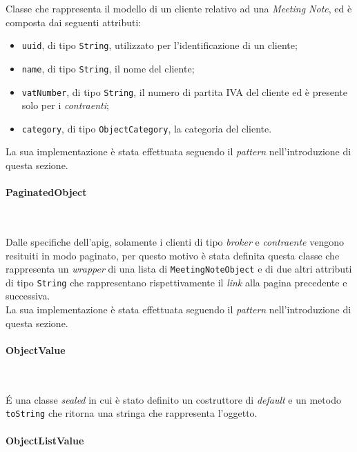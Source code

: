 \noindent Classe che rappresenta il modello di un \gls{cliente} relativo ad una \emph{Meeting Note}, ed è composta dai seguenti attributi:
\begin{itemize}
    \item \lstinline{uuid}, di tipo \lstinline{String}, utilizzato per l'identificazione di un \gls{cliente}\glsoccur;
    \item \lstinline{name}, di tipo \lstinline{String}, il nome del \gls{cliente}\glsoccur;
    \item \lstinline{vatNumber}, di tipo \lstinline{String}, il numero di partita IVA del \gls{cliente} ed è presente solo per i \emph{contraenti};
    \item \lstinline{category}, di tipo \lstinline{ObjectCategory}, la categoria del \gls{cliente}\glsoccur.
\end{itemize}
La sua implementazione è stata effettuata seguendo il \emph{pattern} nell'introduzione di questa sezione.

\paragraph*{PaginatedObject} ~ \\
\label{par:paginated-object}

\noindent Dalle specifiche dell'\gls{apig}\glsoccur, solamente i clienti di tipo \emph{broker} e \emph{contraente} vengono resituiti in modo paginato, per questo motivo è stata definita questa classe che rappresenta un \emph{wrapper} di una lista di \lstinline{MeetingNoteObject} e di due altri attributi di tipo \lstinline{String} che rappresentano rispettivamente il \emph{link} alla pagina precedente e successiva.\\
La sua implementazione è stata effettuata seguendo il \emph{pattern} nell'introduzione di questa sezione.

\paragraph*{ObjectValue} ~ \\
\label{par:object-value}

\noindent É una classe \emph{sealed}\cite{site:sealed-class} in cui è stato definito un costruttore di \emph{default} e un metodo \lstinline{toString} che ritorna una stringa che rappresenta l'oggetto.\\

\paragraph*{ObjectListValue} ~ \\
\label{par:object-list-value}

